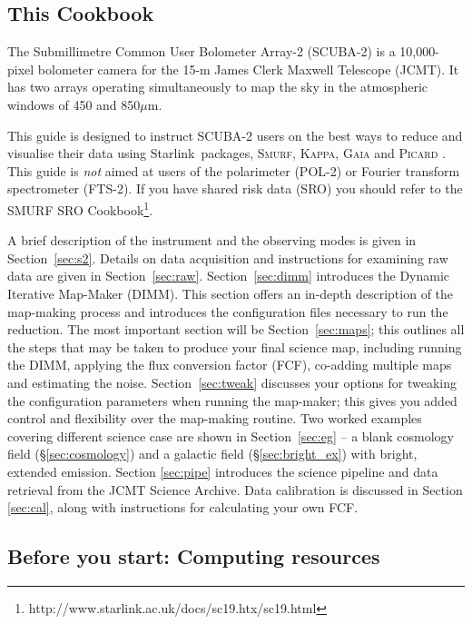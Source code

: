 \documentclass[twoside,11pt]{article}
\newcommand{\htmladdnormallink}[2]{#1}
\newcommand{\xref}[3]{#1}
\newcommand{\xlabel}[1]{}
\renewcommand{\_}{\texttt{\symbol{95}}}
\newcommand{\micron}{\mbox{$\mu$m}}
\newcommand{\starlink}{\htmladdnormallink{Starlink}{http://starlink.jach.hawaii.edu}}
\newcommand{\gaia}{\xref{\textsc{Gaia}}{sun214}{}}
\newcommand{\Kappa}{\xref{\textsc{Kappa}}{sun95}{}}
\newcommand{\picard}{\xref{\textsc{Picard}}{sun265}{}}
\newcommand{\smurf}{\xref{\textsc{Smurf}}{sun258}{}}
\begin{document}
\subsection{\xlabel{using_guide}This Cookbook}

The Submillimetre Common User Bolometer Array-2 (SCUBA-2) is a
10,000-pixel bolometer camera for the 15-m James Clerk Maxwell
Telescope (JCMT). It has two arrays operating simultaneously to map
the sky in the atmospheric windows of 450 and 850\micron.

This guide is designed to instruct SCUBA-2 users on the best ways to
reduce and visualise their data using \starlink\ packages,
\smurf \cite{smurf}, \Kappa \cite{kappa}, \gaia \cite{gaia} and \picard
\cite{picard}.  This guide is {\em not} aimed at users of the
polarimeter (POL-2) or Fourier transform spectrometer (FTS-2). If you
have shared risk data (SRO) you should refer to the SMURF SRO
Cookbook\footnote{http://www.starlink.ac.uk/docs/sc19.htx/sc19.html}.

A brief description of the instrument and the observing modes is given
in Section~\ref{sec:s2}. Details on data acquisition and instructions
for examining raw data are given in Section~\ref{sec:raw}.
Section~\ref{sec:dimm} introduces the Dynamic Iterative Map-Maker
(DIMM). This section offers an in-depth description of the map-making
process and introduces the configuration files necessary to run the
reduction. The most important section will be Section~\ref{sec:maps};
this outlines all the steps that may be taken to produce your final
science map, including running the DIMM, applying the flux conversion
factor (FCF), co-adding multiple maps and estimating the noise.
Section~\ref{sec:tweak} discusses your options for tweaking the configuration
parameters when running the map-maker; this gives you added control
and flexibility over the map-making routine. Two worked examples
covering different science case are shown in Section~\ref{sec:eg} -- a
blank cosmology field (\S\ref{sec:cosmology}) and a galactic field
(\S\ref{sec:bright_ex}) with bright, extended emission. Section
\ref{sec:pipe} introduces the science pipeline and data retrieval from
the JCMT Science Archive.  Data calibration is discussed in Section
\ref{sec:cal}, along with instructions for calculating your own FCF.

\subsection{\xlabel{computing}Before you start: Computing resources}
\end{document}
